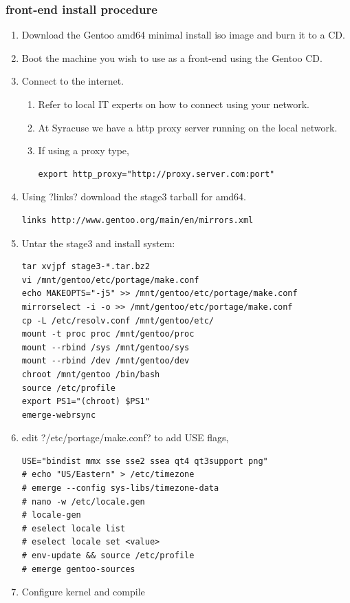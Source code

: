 \subsubsection{front-end install procedure}
\begin{enumerate}
\item Download the Gentoo amd64 minimal install iso image and burn it to a CD.
\item Boot the machine you wish to use as a front-end using the Gentoo CD.
\item Connect to the internet.
  \begin{enumerate}
  \item Refer to local IT experts on how to connect using your network.
  \item At Syracuse we have a http proxy server running on the local network.
  \item If using a proxy type,
\begin{lstlisting}
export http_proxy="http://proxy.server.com:port"
\end{lstlisting}
  \end{enumerate}
\item Using \lstin?links? download the stage3 tarball for amd64.
\begin{lstlisting}
links http://www.gentoo.org/main/en/mirrors.xml
\end{lstlisting}
\item Untar the stage3 and install system:
\begin{lstlisting}
tar xvjpf stage3-*.tar.bz2
vi /mnt/gentoo/etc/portage/make.conf
echo MAKEOPTS="-j5" >> /mnt/gentoo/etc/portage/make.conf
mirrorselect -i -o >> /mnt/gentoo/etc/portage/make.conf
cp -L /etc/resolv.conf /mnt/gentoo/etc/
mount -t proc proc /mnt/gentoo/proc
mount --rbind /sys /mnt/gentoo/sys
mount --rbind /dev /mnt/gentoo/dev
chroot /mnt/gentoo /bin/bash
source /etc/profile
export PS1="(chroot) $PS1"
emerge-webrsync
\end{lstlisting}
\item edit \lstin?/etc/portage/make.conf? to add USE flags,
\begin{lstlisting}
USE="bindist mmx sse sse2 ssea qt4 qt3support png"
# echo "US/Eastern" > /etc/timezone
# emerge --config sys-libs/timezone-data
# nano -w /etc/locale.gen
# locale-gen
# eselect locale list
# eselect locale set <value>
# env-update && source /etc/profile
# emerge gentoo-sources
\end{lstlisting}
\item Configure kernel and compile

\end{enumerate}
